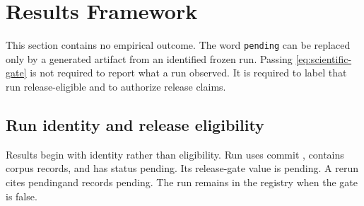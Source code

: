\section{Results Framework}
\label{sec:results-framework}

This section contains no empirical outcome. The word \texttt{pending} can be
replaced only by a generated artifact from an identified frozen run. Passing
\cref{eq:scientific-gate} is not required to report what a run observed. It is
required to label that run release-eligible and to authorize release claims.

\providecommand{\AFDReleaseGate}{pending}
\providecommand{\AFDRunStatus}{pending}
\providecommand{\AFDPredecessorRun}{pending}
\providecommand{\AFDRerunReason}{pending}
\providecommand{\AFDFalseAcceptanceNumerator}{pending}
\providecommand{\AFDFalseAcceptanceDenominator}{pending}
\providecommand{\AFDFalseAcceptanceRate}{pending}
\providecommand{\AFDFalseBlockingNumerator}{pending}
\providecommand{\AFDFalseBlockingDenominator}{pending}
\providecommand{\AFDFalseBlockingRate}{pending}
\providecommand{\AFDExpectedActionMismatches}{pending}
\providecommand{\AFDPipelineErrors}{pending}
\providecommand{\AFDReasonMismatches}{pending}
\providecommand{\AFDCanonicalGateFailures}{pending}
\providecommand{\AFDDifferentialFailures}{pending}
\providecommand{\AFDFidelityFailures}{pending}
\providecommand{\AFDFuzzFailures}{pending}
\providecommand{\AFDFaultFailures}{pending}
\providecommand{\AFDExactStableOutputs}{pending}
\providecommand{\AFDSemanticClosureOutputs}{pending}
\providecommand{\AFDPerformanceCI}{pending}
\providecommand{\AFDServiceRate}{pending}

\subsection{Run identity and release eligibility}
\label{subsec:results-identity}

Results begin with identity rather than eligibility. Run \AFDRunID uses commit
\AFDCommit, contains \AFDCorpusSamples corpus records, and has status
\AFDRunStatus. Its release-gate value is \AFDReleaseGate. A rerun cites
\AFDPredecessorRun and records \AFDRerunReason. The run remains in the registry
when the gate is false.

